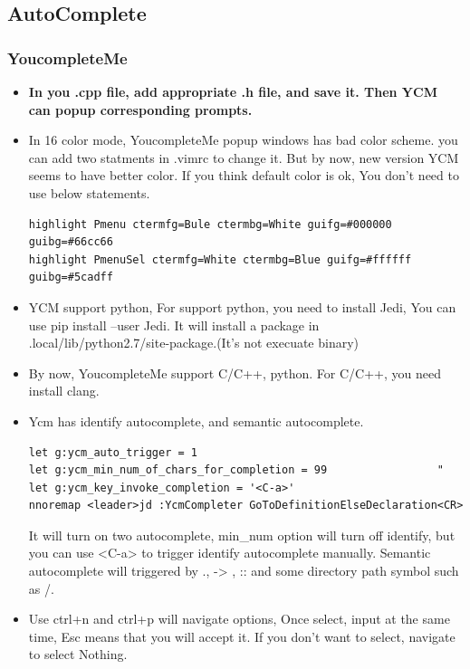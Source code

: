 \documentclass[a4paper,12pt,twoside]{book}
\begin{document}
\subsection{AutoComplete}
\subsubsection{YoucompleteMe}

\begin{itemize}

		\item \textbf{In you .cpp file, add appropriate .h file, and save it. Then YCM can  popup corresponding prompts.}


		\item In 16 color mode, YoucompleteMe popup windows has bad color scheme. you can add two statments in .vimrc to change it. But by now, new version YCM seems to have better color. If you think default color is ok, You don't need to use below statements. 
\begin{verbatim}
highlight Pmenu ctermfg=Bule ctermbg=White guifg=#000000 guibg=#66cc66
highlight PmenuSel ctermfg=White ctermbg=Blue guifg=#ffffff guibg=#5cadff
\end{verbatim}

\item YCM support python, For support python, you need to install Jedi, You can use pip install --user Jedi.	It will install a package in .local/lib/python2.7/site-package.(It's not execuate binary)	

\item By now, YoucompleteMe support C/C++, python. For C/C++, you need install clang.  

\item Ycm has identify autocomplete, and semantic autocomplete. 
\begin{verbatim}
let g:ycm_auto_trigger = 1
let g:ycm_min_num_of_chars_for_completion = 99                 "
let g:ycm_key_invoke_completion = '<C-a>'
nnoremap <leader>jd :YcmCompleter GoToDefinitionElseDeclaration<CR>
\end{verbatim}
It will turn on two autocomplete, min\_num option will turn off identify, but you can use <C-a> to trigger identify autocomplete manually. Semantic autocomplete will triggered by ., -> , :: and some directory path symbol such as /. 

\item Use ctrl+n and ctrl+p will navigate options, Once select, input at the same time, Esc means that you will accept it. If you don't want to select, navigate to select Nothing. 


\end{itemize}
\end{document}
